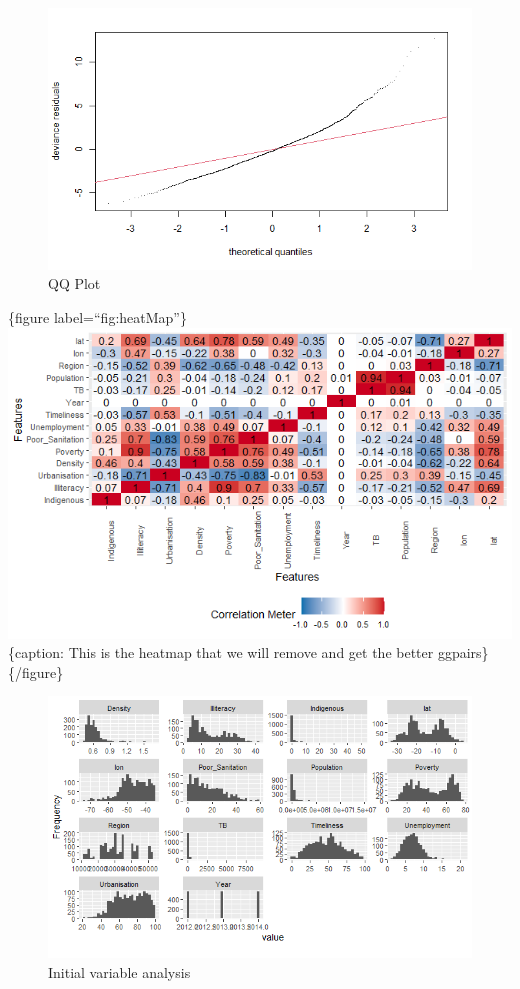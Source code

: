 \documentclass[
  letterpaper,
  DIV=11,
  numbers=noendperiod]{scrartcl}
\begin{document}
\begin{figure}

{\centering \includegraphics{QQ.png}

}

\caption{QQ Plot}

\end{figure}

\{figure label=``fig:heatMap''\} \includegraphics{HeatMap.png}
\{caption: This is the heatmap that we will remove and get the better
ggpairs\} \{/figure\}

\begin{figure}

{\centering \includegraphics{histogramExploratoryAnalysis.png}

}

\caption{Initial variable analysis}

\end{figure}
\end{document}
